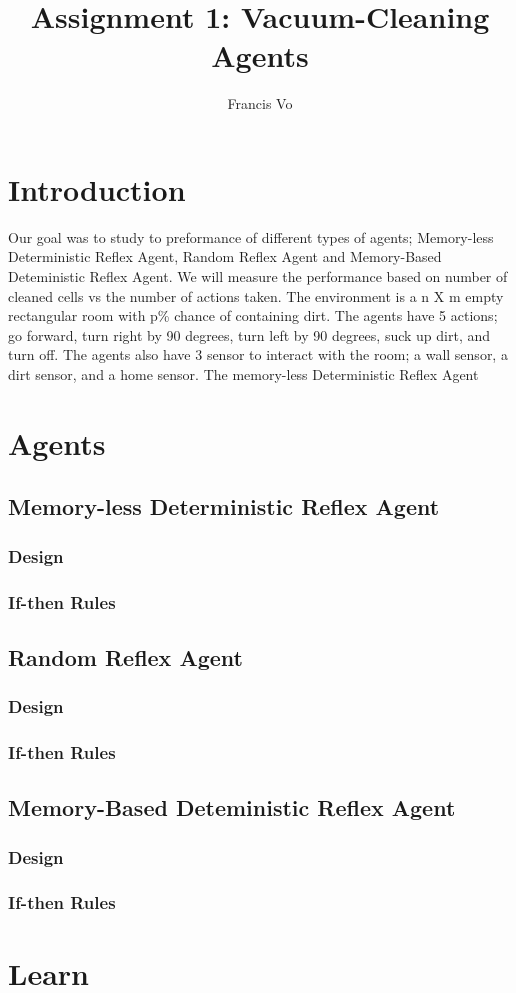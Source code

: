 \documentclass[a4paper,10pt]{article}
\title{Assignment 1: Vacuum-Cleaning Agents}
\author{Francis Vo}
\begin{document}
\maketitle

\section{Introduction}
Our goal was to study to preformance of different types of agents; Memory-less Deterministic Reflex Agent, Random Reflex Agent and Memory-Based Deteministic Reflex Agent. 
We will measure the performance based on number of cleaned cells vs the number of actions taken. 
The environment is a n X m empty rectangular room with p\% chance of containing dirt. 
The agents have 5 actions; go forward, turn right by 90 degrees, turn left by 90 degrees, suck up dirt, and turn off. 
The agents also have 3 sensor to interact with the room; a wall sensor, a dirt sensor, and a home sensor. 
The memory-less Deterministic Reflex Agent 

\section{Agents}
\subsection{Memory-less Deterministic Reflex Agent}
\subsubsection{Design}
\subsubsection{If-then Rules}

\subsection{Random Reflex Agent}
\subsubsection{Design}
\subsubsection{If-then Rules}

\subsection{Memory-Based Deteministic Reflex Agent}
\subsubsection{Design}
\subsubsection{If-then Rules}

\section{Learn}
\end{document}
